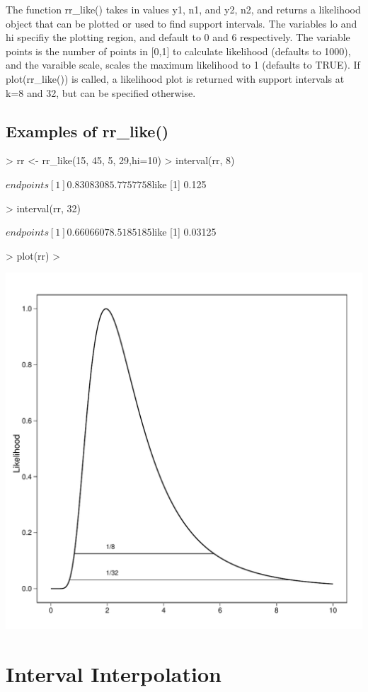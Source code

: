 \documentclass{article}
\begin{document}
The function rr\_like() takes in values y1, n1, and y2, n2, and returns a likelihood object that can be plotted or used to find support intervals.  The variables lo and hi specifiy the plotting region, and default to 0 and 6 respectively. The variable points is the number of points in [0,1] to calculate likelihood (defaults to 1000), and the varaible scale, scales the maximum likelihood to 1 (defaults to TRUE).  If plot(rr\_like()) is called, a likelihood plot is returned with support intervals at k=8 and 32, but can be specified otherwise.  

\subsection{Examples of rr\_like()}

\begin{Schunk}
\begin{Sinput}
> rr <- rr_like(15, 45, 5, 29,hi=10)
> interval(rr, 8)
\end{Sinput}
\begin{Soutput}
$endpoints
[1] 0.8308308 5.7757758

$like
[1] 0.125
\end{Soutput}
\begin{Sinput}
> interval(rr, 32)
\end{Sinput}
\begin{Soutput}
$endpoints
[1] 0.6606607 8.5185185

$like
[1] 0.03125
\end{Soutput}
\begin{Sinput}
> plot(rr)
> 
\end{Sinput}
\end{Schunk}
\includegraphics{rr.pdf}\section{Interval Interpolation}
\end{document}
